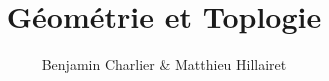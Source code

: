 \documentclass[a4paper,12pt,draft]{book}
\title{{\color{astral}\sffamily\bfseries G\'eom\'etrie et Toplogie}}
\author{Benjamin Charlier \& Matthieu Hillairet}
\begin{document}
\maketitle
\tableofcontents


\tikzexternaldisable


%





 
\end{document}
